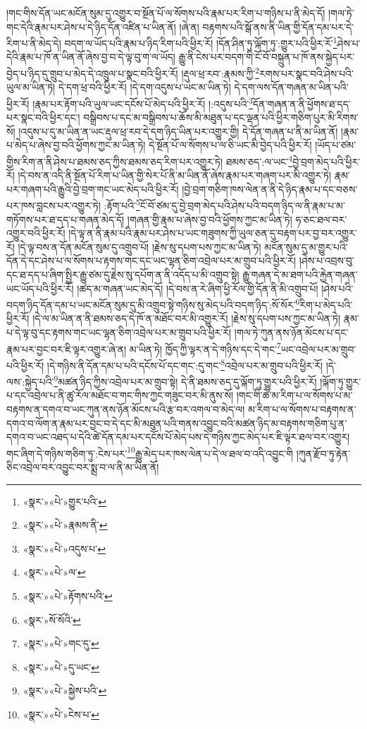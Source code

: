 །གང་གིས་དོན་ཡང་མངོན་སུམ་དུ་འགྱུར་བ་སྔོན་པོ་ལ་སོགས་པའི་རྣམ་པར་རིག་པ་གཉིས་པ་ནི་མེད་དོ། །གལ་ཏེ་གང་དེའི་རྣམ་པར་ཤེས་པ་དེ་ཉིད་དོན་འཛིན་པ་ཡིན་ནོ། །ཞེ་ན། བརྟགས་པའི་སྒོ་ནས་ནི་ཡིན་གྱི་དོན་དམ་པར་དེ་རིག་པ་ནི་མེད་དེ། བདག་ལ་ཡོད་པའི་རྣམ་པ་ཉིད་རིག་པའི་ཕྱིར་རོ། །དོན་ཤིན་ཏུ་ལྐོག་ཏུ་:གྱུར་པའི་ཕྱིར་རོ་\footnote{«སྣར་»«པེ་»གྱུར་པའི་}ཤེས་པ་དེའི་རྣམ་པ་ཁོ་ན་ཡིན་ནོ་ཞེས་བྱ་བ་དེ་ལྟ་བུ་ག་ལ་ཡོད། རྒྱུ་ནི་ངེས་པར་བདག་གི་ངོ་བོ་བསྐྲུན་པ་ཁོ་ནས་སྐྱེད་པར་བྱེད་པ་ཉིད་དུ་གྲུབ་པ་མེད་དེ་འཁྲུལ་པ་སྣང་བའི་ཕྱིར་རོ། །རྡུལ་ཕྲ་རབ་:རྣམས་ཀྱི་\footnote{«སྣར་»«པེ་»རྣམས་ནི་}རགས་པར་སྣང་བའི་ཤེས་པའི་ཡུལ་མ་ཡིན་ཏེ། དེ་དག་ཕྲ་བའི་ཕྱིར་རོ། །དེ་དག་འདུས་པ་ཡང་མ་ཡིན་ཏེ། དེ་དག་ལས་དོན་གཞན་མ་ཡིན་པའི་ཕྱིར་རོ། །རྣམ་པར་རྟོག་པའི་ཡུལ་ཡང་དངོས་པོ་མེད་པའི་ཕྱིར་རོ། །:འདུས་པའི་\footnote{«སྣར་»«པེ་»འདུས་པ་}དོན་གཞན་ན་ནི་ཕྱོགས་ཐ་དད་པར་སྣང་བའི་ཕྱིར་དང་། བསྒྲིབས་པ་དང་མ་བསྒྲིབས་པ་ཆོས་མི་མཐུན་པ་དང་ལྡན་པའི་ཕྱིར་གཅིག་པུར་མི་རིགས་སོ། །འདུས་པ་དུ་མ་ཡིན་ན་ཡང་རྡུལ་ཕྲ་རབ་དེ་དག་ཉིད་ཡིན་པར་འགྱུར་གྱི། དེ་དོན་གཞན་པ་ནི་མ་ཡིན་ནོ། །རྣམ་པ་མེད་པ་ཞེས་བྱ་བའི་ཕྱོགས་ཀྱང་མ་ཡིན་ཏེ། དེ་སྔོན་པོ་ལ་སོགས་པ་ལ་ཅི་ཡང་མི་བྱེད་པའི་ཕྱིར་རོ། །ཡོད་པ་ཙམ་གྱིས་རིག་ན་ནི་ཤེས་པ་ཐམས་ཅད་ཀྱིས་ཐམས་ཅད་རིག་པར་འགྱུར་ཏེ། ཐམས་ཅད་:ལ་ཡང་\footnote{«སྣར་»«པེ་»ལ་}བྱེ་བྲག་མེད་པའི་ཕྱིར་རོ། །དེ་བས་ན་འདི་ནི་སྔོན་པོ་རིག་པ་ཡིན་གྱི་སེར་པོ་ནི་མ་ཡིན་ནོ་ཞེས་རྣམ་པར་གཞག་པར་མི་འགྱུར་ཏེ། རྣམ་པར་གཞག་པའི་རྒྱུའི་བྱེ་བྲག་གང་ཡང་མེད་པའི་ཕྱིར་རོ། །བྱེ་བྲག་གཅིག་ཁས་ལེན་ན་ནི་དེ་ཉིད་རྣམ་པ་དང་བཅས་པར་ཁས་བླངས་པར་འགྱུར་ཏེ། :རྟོག་པའི་\footnote{«སྣར་»«པེ་»རྟོགས་པའི་}ངོ་བོ་ཙམ་དུ་བྱེ་བྲག་མེད་པའི་ཤེས་པའི་བདག་ཉིད་ལ་ནི་རྣམ་པ་མ་གཏོགས་པར་ཐ་དད་པ་གཞན་མེད་དོ། །གཞན་གྱི་རྣམ་པ་ཞེས་བྱ་བའི་ཕྱོགས་ཀྱང་མ་ཡིན་ཏེ། ཧ་ཅང་ཐལ་བར་འགྱུར་བའི་ཕྱིར་རོ། །དེ་ལྟ་ན་ནི་རྣམ་པའི་རྣམ་པར་ཤེས་པ་ཡང་གཟུགས་ཀྱི་ཡུལ་ཅན་དུ་བརྟག་པར་བྱ་བར་འགྱུར་རོ། །དེ་ལྟ་བས་ན་དོན་མངོན་སུམ་དུ་འགྲུབ་པོ། །རྗེས་སུ་དཔག་པས་ཀྱང་མ་ཡིན་ཏེ། མངོན་སུམ་དུ་མ་གྱུར་པའི་དོན་དེ་དང་ཤེས་པ་ལ་སོགས་པ་རྟགས་གང་དང་ཡང་ལྷན་ཅིག་འབྲེལ་པར་མ་གྲུབ་པའི་ཕྱིར་རོ། །ཤེས་པ་འབྲས་བུ་དང་ཐ་དད་པ་ཞིག་སྤྱིར་རྒྱུ་ཙམ་དུ་རྗེས་སུ་དཔོག་ན་ནི་འདོད་པ་མི་འགྲུབ་སྟེ། རྒྱུ་གཞན་དེ་མ་ཐག་པའི་རྐྱེན་གཞན་ཡང་ཡོད་པའི་ཕྱིར་རོ། །ཚད་མ་གཞན་ཡང་མེད་དོ། །དེ་བས་ན་རེ་ཞིག་ཕྱི་རོལ་གྱི་དོན་ནི་མི་འགྲུབ་པོ། །ཤེས་པའི་བདག་ཉིད་དོན་དམ་པ་ཡང་མངོན་སུམ་དུ་མི་འགྲུབ་སྟེ་གཉིས་སུ་མེད་པའི་བདག་ཉིད་:སོ་སོར་\footnote{«སྣར་»སོ་སོའི་}རིག་པ་མེད་པའི་ཕྱིར་རོ། །དེ་ལ་མ་ཡིན་ན་ནི་ཐམས་ཅད་དེ་ཁོ་ན་མཐོང་བར་མི་འགྱུར་རོ། །རྗེས་སུ་དཔག་པས་ཀྱང་མ་ཡིན་ཏེ། རྣམ་པ་དེ་ལྟ་བུ་དང་རྟགས་གང་ཡང་ལྷན་ཅིག་འབྲེལ་པར་མ་གྲུབ་པའི་ཕྱིར་རོ། །གལ་ཏེ་ཀུན་ནས་ཉོན་མོངས་པ་དང་རྣམ་པར་བྱང་བར་ཇི་ལྟར་འགྱུར་ཞེ་ན། མ་ཡིན་ཏེ། ཁྱོད་ཀྱི་ལྟར་ན་དེ་གཉིས་དང་དེ་གང་\footnote{«སྣར་»«པེ་»གང་དུ་}ཡང་འབྲེལ་པར་མ་གྲུབ་པའི་ཕྱིར་རོ། །དེ་གཉིས་ནི་དོན་དམ་པ་པའི་དངོས་པོ་དང་གང་:དུ་གང་\footnote{«སྣར་»«པེ་»དུ་ཡང་}འབྲེལ་པར་མ་གྲུབ་པའི་ཕྱིར་རོ། །དེ་ལས་:སྐྱེད་པའི་\footnote{«སྣར་»«པེ་»སྐྱེས་པའི་}མཚན་ཉིད་ཀྱིས་འབྲེལ་པར་མ་གྲུབ་སྟེ། དེ་ནི་ཐམས་ཅད་དུ་ལྐོག་ཏུ་གྱུར་པའི་ཕྱིར་རོ། །ལྐོག་ཏུ་གྱུར་པ་དང་འབྲེལ་པ་ནི་ཚུ་རོལ་མཐོང་བ་གང་གིས་ཀྱང་གཟུང་བར་མི་ནུས་སོ། །གང་གི་ཚེ་མ་རིག་པ་ལ་སོགས་པ་མ་བརྟགས་ན་དགའ་བ་ཡང་ཀུན་ནས་ཉོན་མོངས་པའི་རྩ་བར་འགལ་བ་མེད་ལ། མ་རིག་པ་ལ་སོགས་པ་བརྟགས་ན་དགའ་བ་ལོག་ན་རྣམ་པར་བྱང་བ་དེ་དང་མི་མཐུན་པའི་གནས་འབྱུང་བའི་མཚན་ཉིད་མ་བརྟགས་གཅིག་པུ་ན་དགའ་བ་ཡང་འཐད་པ་དེའི་ཚེ་དོན་དམ་པར་དངོས་པོ་མེད་པས་དེ་གཉིས་ཀྱང་མེད་པར་ཇི་ལྟར་ཐལ་བར་འགྱུར། གང་ཞིག་དེ་གཉིས་གཅིག་ཏུ་:ངེས་པར་\footnote{«སྣར་»«པེ་»ངེས་པ་}རྒྱུ་མེད་པར་ཁས་ལེན་པ་དེ་ལ་ཐལ་བ་འདི་འབྱུང་གི །ཀུན་རྫོབ་ཏུ་རྟེན་ཅིང་འབྲེལ་བར་འབྱུང་བར་སྨྲ་བ་ལ་ནི་མ་ཡིན་ནོ། 
